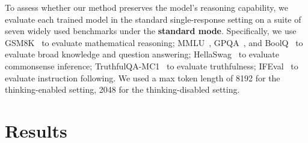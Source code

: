 To assess whether our method preserves the model's reasoning capability, we evaluate each trained model in the standard single-response setting on a suite of seven widely used benchmarks under the \textbf{standard mode}. Specifically, we use GSM8K~\citep{cobbe2021gsm8k} to evaluate mathematical reasoning; MMLU~\citep{hendryckstest2021}, GPQA~\citep{rein2024gpqa}, and BoolQ~\citep{clark2019boolq} to evaluate broad knowledge and question answering; HellaSwag~\citep{zellers2019hellaswag} to evaluate commonsense inference; TruthfulQA-MC1~\citep{lin2022truthfulqameasuringmodelsmimic} to evaluate truthfulness; IFEval~\citep{zhou2023instructionfollowingevaluationlargelanguage} to evaluate instruction following. We used a max token length of 8192 for the thinking-enabled setting, 2048 for the thinking-disabled setting. 







\section{Results}

